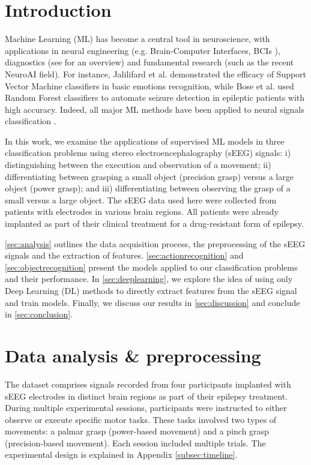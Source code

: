 \documentclass[10pt,conference,compsocconf]{IEEEtran}
\begin{document}
\section{Introduction}
Machine Learning (ML) has become a central tool in neuroscience, with applications in neural engineering (e.g. Brain-Computer Interfaces, BCIs \cite{eegforbci}), diagnostics (see \cite{VIEIRA201758} for an overview) and fundamental research (such as the recent NeuroAI field). For instance, Jalilifard et al. \cite{EmotionClassificationSVM} demonstrated the efficacy of Support Vector Machine classifiers in basic emotions recognition, while Bose et al. \cite{EEGRandomForset} used Random Forest classifiers to automate seizure detection in epileptic patients with high accuracy. Indeed, all major ML methods have been applied to neural signals classification \cite{EEGMLReview}.

In this work, we examine the applications of supervised ML models in three classification problems using stereo electroencephalography (sEEG) signals: i) distinguishing between the execution and observation of a movement; ii) differentiating between grasping a small object (precision grasp) versus a large object (power grasp); and iii) differentiating between observing the grasp of a small versus a large object. The sEEG data used here were collected from patients with electrodes in various brain regions. All patients were already implanted as part of their clinical treatment for a drug-resistant form of epilepsy.


\autoref{sec:analysis} outlines the data acquisition process, the preprocessing of the sEEG signals and the extraction of features. \autoref{sec:actionrecognition} and \autoref{sec:objectrecognition} present the models applied to our classification problems and their performance. In \autoref{sec:deeplearning}, we explore the idea of using only Deep Learning (DL) methods to directly extract features from the sEEG signal and train models. Finally, we discuss our results in \autoref{sec:discussion} and conclude in \autoref{sec:conclusion}.

\section{Data analysis \& preprocessing}
\label{sec:analysis}
The dataset comprises signals recorded from four participants implanted with sEEG electrodes in distinct brain regions as part of their epilepsy treatment. During multiple experimental sessions, participants were instructed to either observe or execute specific motor tasks. These tasks involved two types of movements: a palmar grasp (power-based movement) and a pinch grasp (precision-based movement). Each session included multiple trials. The experimental design is explained in Appendix \ref{subsec:timeline}.
\end{document}
